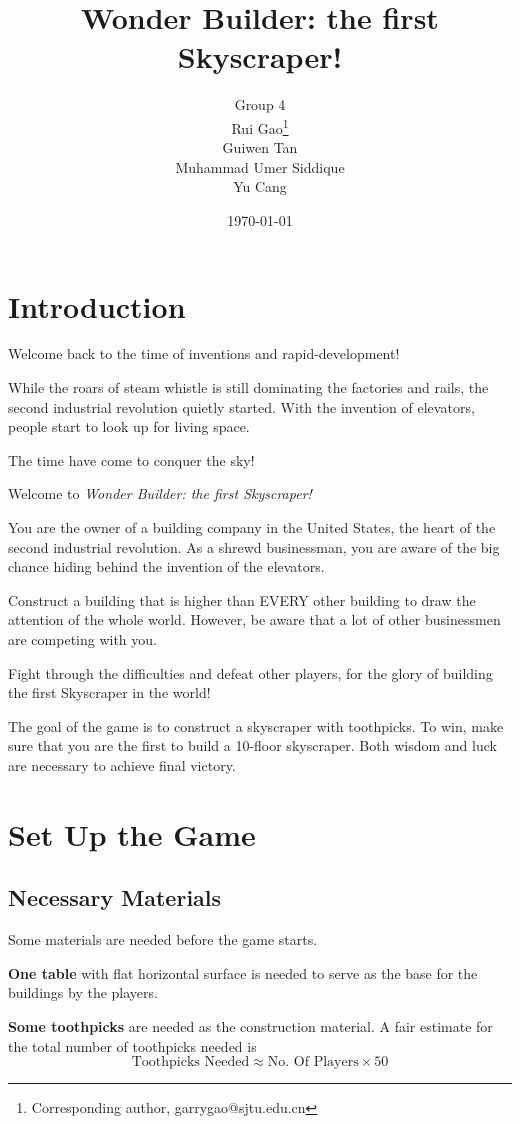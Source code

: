 \documentclass[a4paper, twocolumn, 12pt, twoside, english]{article}
\author{Group 4\\Rui Gao\footnote{Corresponding author, garrygao@sjtu.edu.cn}\quad118370910003\\Guiwen Tan\quad118370910014\\ Muhammad Umer Siddique\quad118370990001\\Yu Cang\quad 018370210001}
\title{Wonder Builder: the first Skyscraper!}
\date{\today}
\begin{document}
\maketitle


\section{Introduction}
\begin{tcolorbox}[title = {Hello!}]
Welcome back to the time of inventions and rapid-development!

While the roars of steam whistle is still dominating the factories and rails, the second industrial revolution quietly started. With the invention of elevators, people start to look up for living space.

The time have come to conquer the sky!
\end{tcolorbox}

Welcome to {\it Wonder Builder: the first Skyscraper!}

You are the owner of a building company in the United States, the heart of the second industrial revolution. As a shrewd businessman, you are aware of the big chance hiding behind the invention of the elevators.

Construct a building that is higher than EVERY other building to draw the attention of the whole world. However, be aware that a lot of other businessmen are competing with you.

Fight through the difficulties and defeat other players, for the glory of building the first Skyscraper in the world!\bigskip

The goal of the game is to construct a skyscraper with toothpicks. To win, make sure that you are the first to build a 10-floor skyscraper. Both wisdom and luck are necessary to achieve final victory.


\section{Set Up the Game}

\subsection{Necessary Materials}
Some materials are needed before the game starts.

{\bf One table} with flat horizontal surface is needed to serve as the base for the buildings by the players.

{\bf Some toothpicks}\cite{ref:por} are needed as the construction material. A fair estimate for the total number of toothpicks needed is
\[
\text{Toothpicks Needed} \approx \text{No. Of Players} \times 50
\]
\end{document}
